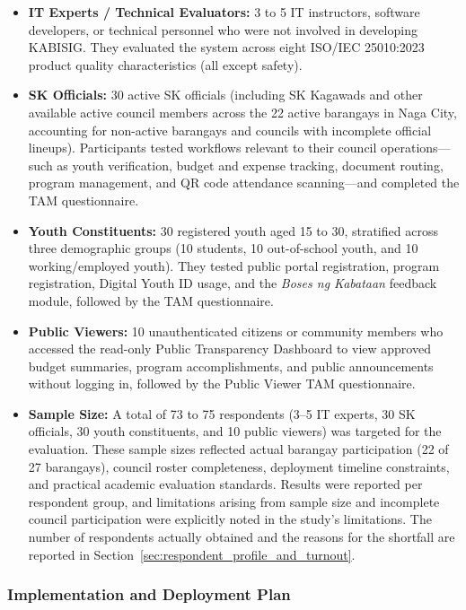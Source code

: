 \begin{itemize}
    \item \textbf{IT Experts / Technical Evaluators:} 3 to 5 IT instructors, software developers, or technical personnel who were not involved in developing KABISIG. They evaluated the system across eight ISO/IEC 25010:2023 product quality characteristics (all except safety).
    \item \textbf{SK Officials:} 30 active SK officials (including SK Kagawads and other available active council members across the 22 active barangays in Naga City, accounting for non-active barangays and councils with incomplete official lineups). Participants tested workflows relevant to their council operations---such as youth verification, budget and expense tracking, document routing, program management, and QR code attendance scanning---and completed the TAM questionnaire.
    \item \textbf{Youth Constituents:} 30 registered youth aged 15 to 30, stratified across three demographic groups (10 students, 10 out-of-school youth, and 10 working/employed youth). They tested public portal registration, program registration, Digital Youth ID usage, and the \textit{Boses ng Kabataan} feedback module, followed by the TAM questionnaire.
    \item \textbf{Public Viewers:} 10 unauthenticated citizens or community members who accessed the read-only Public Transparency Dashboard to view approved budget summaries, program accomplishments, and public announcements without logging in, followed by the Public Viewer TAM questionnaire.
    \item \textbf{Sample Size:} A total of 73 to 75 respondents (3--5 IT experts, 30 SK officials, 30 youth constituents, and 10 public viewers) was targeted for the evaluation. These sample sizes reflected actual barangay participation (22 of 27 barangays), council roster completeness, deployment timeline constraints, and practical academic evaluation standards. Results were reported per respondent group, and limitations arising from sample size and incomplete council participation were explicitly noted in the study's limitations. The number of respondents actually obtained and the reasons for the shortfall are reported in Section~\ref{sec:respondent_profile_and_turnout}.
\end{itemize}

\subsubsection{Implementation and Deployment Plan}
\label{subsubsec:implementation_and_deployment_plan}

